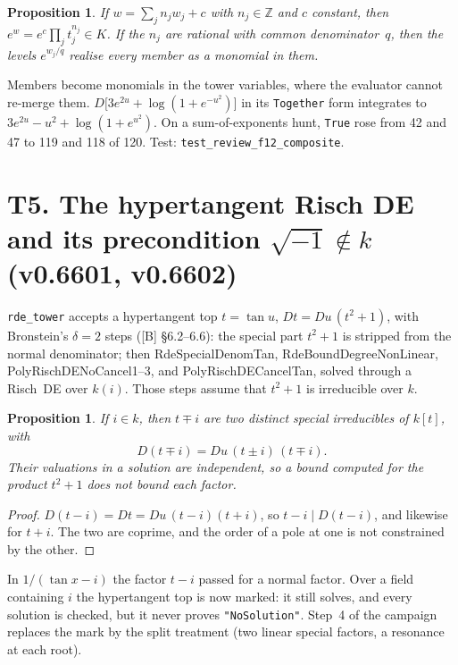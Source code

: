 \documentclass[11pt]{article}
\newtheorem{proposition}[theorem]{Proposition}
\theoremstyle{definition}
\theoremstyle{remark}
\newcommand{\Z}{\mathbb{Z}}
\newcommand{\code}[1]{\texttt{#1}}
\begin{document}
\begin{proposition}
If $w=\sum_jn_jw_j+c$ with $n_j\in\Z$ and $c$ constant, then $e^w=e^c\prod_jt_j^{n_j}\in K$.
If the $n_j$ are rational with common denominator~$q$, then the levels
$e^{w_j/q}$ realise every member as a monomial in them.
\end{proposition}

Members become monomials in the tower variables, where the evaluator cannot re-merge
them. $D\bigl[3e^{2u}+\log(1+e^{-u^2})\bigr]$ in its \code{Together} form integrates to
$3e^{2u}-u^2+\log(1+e^{u^2})$. On a sum-of-exponents hunt, \code{True} rose from 42 and 47
to 119 and 118 of 120. Test: \code{test\_review\_f12\_composite}.

\section*{T5. The hypertangent Risch DE and its precondition $\sqrt{-1}\notin k$ (v0.6601, v0.6602)}

\code{rde\_tower} accepts a hypertangent top $t=\tan u$, $Dt=Du\,(t^2+1)$, with
Bronstein's $\delta=2$ steps ([B] \S6.2--6.6): the special part $t^2+1$ is stripped
from the normal denominator; then RdeSpecialDenomTan, RdeBoundDegreeNonLinear,
PolyRischDENoCancel1--3, and PolyRischDECancelTan, solved through a Risch~DE over
$k(i)$. Those steps assume that $t^2+1$ is irreducible over $k$.

\begin{proposition}\label{prop:T5}
If $i\in k$, then $t\mp i$ are two distinct special irreducibles of $k[t]$, with
\[ D(t\mp i)=Du\,(t\pm i)\,(t\mp i). \]
Their valuations in a solution are independent, so a bound computed for the product
$t^2+1$ does not bound each factor.
\end{proposition}

\begin{proof}
$D(t-i)=Dt=Du\,(t-i)(t+i)$, so $t-i\mid D(t-i)$, and likewise for $t+i$. The two are
coprime, and the order of a pole at one is not constrained by the other.
\end{proof}

In $1/(\tan x-i)$ the factor $t-i$ passed for a normal factor. Over a field containing
$i$ the hypertangent top is now marked: it still solves, and every solution is checked,
but it never proves \code{"NoSolution"}. Step~4 of the campaign replaces the mark by the
split treatment (two linear special factors, a resonance at each root).
\end{document}
